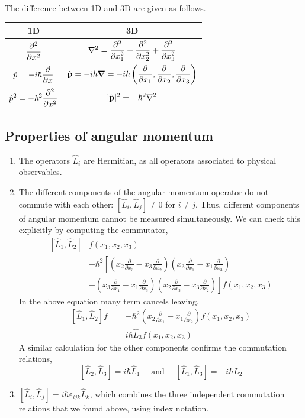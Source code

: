 \documentclass[a4paper]{article}
\begin{document}
The difference between 1D and 3D are given as follows. 
\begin{center}
	\begin{tabular}{cc}
		\toprule 
		\textbf{1D} & \textbf{3D} \\ \midrule 
		$\displaystyle \pdv[2]{}{x}$  &  $\displaystyle \laplacian = \pdv[2]{}{x_1} + \pdv[2]{}{x_2} + \pdv[2]{}{x_3}$ \\[1em]
		$\displaystyle \hat p = -i \hbar \pdv{}{x}$ & $\displaystyle \hat{\mathbf{p}} = - i \hbar \grad = -i \hbar \left( \pdv{}{x_1},\pdv{}{x_2},\pdv{}{x_3} \right)$  \\ 
		$\displaystyle \hat{p}^2 = - \hbar^2 \pdv[2]{}{x}$ & $\displaystyle |\hat{\mathbf{p}}|^2 = - \hbar^2 \laplacian$\\ \bottomrule
	\end{tabular}
\end{center}

\subsection{Properties of angular momentum}

\begin{enumerate}
	\item The operators $\hat{L}_i$ are Hermitian, as all operators associated to physical observables.
	\item The different components of the angular momentum operator do not commute with each other: $\left[\hat{L}_i, \hat{L}_j\right] \neq 0$ for $i \neq j$. Thus, different components of angular momentum cannot be measured simultaneously.
	We can check this explicitly by computing the commutator,
	\[
	\begin{aligned}
	\left[\hat{L}_1, \hat{L}_2\right] &f\left(x_1, x_2, x_3\right)\\ 
	=\,&-\hbar^2\left[\left(x_2 \frac{\partial}{\partial x_3}-x_3 \frac{\partial}{\partial x_2}\right)\left(x_3 \frac{\partial}{\partial x_1}-x_1 \frac{\partial}{\partial x_3}\right)\right.\\ 
	&\left.-\left(x_3 \frac{\partial}{\partial x_1}-x_1 \frac{\partial}{\partial x_3}\right)\left(x_2 \frac{\partial}{\partial x_3}-x_3 \frac{\partial}{\partial x_2}\right)\right] f\left(x_1, x_2, x_3\right)
	\end{aligned}
	\]
	In the above equation many term cancels leaving,
	\[
	\begin{aligned}
	{\left[\hat{L}_1, \hat{L}_2\right] f } &=-\hbar^2\left(x_2 \frac{\partial}{\partial x_1}-x_1 \frac{\partial}{\partial x_2}\right) f\left(x_1, x_2, x_3\right) \\
	&=i \hbar \hat{L}_3 f\left(x_1, x_2, x_3\right)
	\end{aligned}
	\]
	A similar calculation for the other components confirms the commutation relations,
	\[
	\left[\hat{L}_2, \hat{L}_3\right]=i \hbar \hat{L}_1 \quad \text { and } \quad\left[\hat{L}_1, \hat{L}_3\right]=-i \hbar \hat{L}_2
	\]
	\item $\left[\hat{L}_i, \hat{L}_j\right]=i \hbar \varepsilon_{i j k} \hat{L}_k$, which combines the three independent commutation relations that we found above, using index notation.
\end{enumerate}
\end{document}
